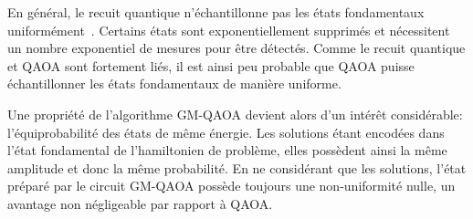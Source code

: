 En général, le recuit quantique n'échantillonne pas les états fondamentaux uniformément~\cite{matsudaGroundstateStatisticsAnnealing2009, mandraExponentiallyBiasedGroundState2017}. Certains états sont exponentiellement supprimés et nécessitent un nombre exponentiel de mesures pour être détectés. Comme le recuit quantique et QAOA sont fortement liés, il est ainsi peu probable que QAOA puisse échantillonner les états fondamentaux de manière uniforme.

Une propriété de l'algorithme GM-QAOA devient alors d'un intérêt considérable: l'équiprobabilité des états de même énergie. Les solutions étant encodées dans l'état fondamental de l'hamiltonien de problème, elles possèdent ainsi la même amplitude et donc la même probabilité. En ne considérant que les solutions, l'état préparé par le circuit GM-QAOA possède toujours une non-uniformité nulle, un avantage non négligeable par rapport à QAOA.
